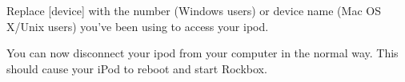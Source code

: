 \begin{enumerate}
  Replace [device] with the number (Windows users) or device name (Mac OS X/Unix 
  users) you've been using to access your ipod.

  You can now disconnect your ipod from your computer in the normal way. This 
  should cause your iPod to reboot and start Rockbox.
  
\end{enumerate} 